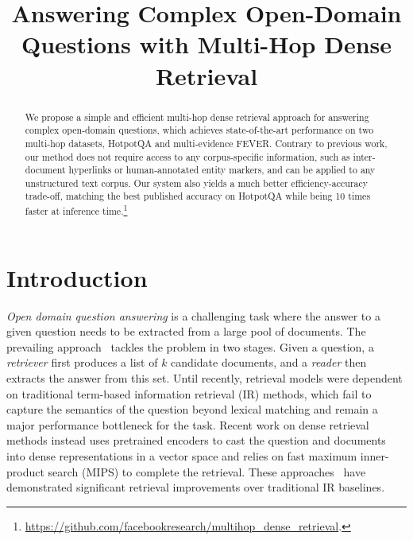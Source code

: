 \title{Answering Complex Open-Domain Questions with Multi-Hop Dense Retrieval}



\maketitle

\begin{abstract}
We propose a simple and efficient multi-hop dense retrieval approach for answering complex open-domain questions, which achieves state-of-the-art performance on two multi-hop datasets, HotpotQA and multi-evidence FEVER. Contrary to previous work, our method does not require access to any corpus-specific information, such as inter-document hyperlinks or human-annotated entity markers, and can be applied to any unstructured text corpus. Our system also yields a much better efficiency-accuracy trade-off, matching the best published accuracy on HotpotQA while being 10 times faster at inference time.\footnote{\url{https://github.com/facebookresearch/multihop_dense_retrieval}.}

\end{abstract}

\section{Introduction}

\emph{Open domain question answering} is a challenging task where the answer to a given question needs to be extracted from a large pool %
of documents.  
The prevailing approach~\citep{drqa} tackles the problem in two stages. Given a question, a \emph{retriever} first produces a %
list of $k$ candidate documents, and a \emph{reader} then extracts the answer from this %
set.
Until recently, retrieval models were dependent on traditional term-based information retrieval (IR) methods, which fail to capture the semantics of the question beyond lexical matching and remain a major performance bottleneck for the task. Recent work on dense retrieval methods instead uses pretrained encoders to cast the question and documents into dense representations in a vector space and relies on fast maximum inner-product search (MIPS) to complete the retrieval. These approaches~\citep{ORQA,REALM,DPR} have demonstrated significant retrieval improvements over traditional IR baselines.  

